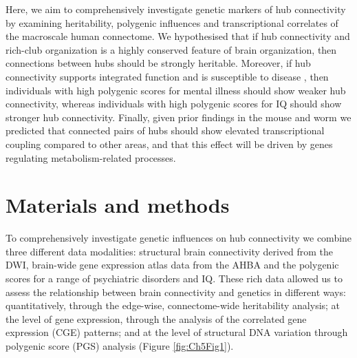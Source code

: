 Here, we aim to comprehensively investigate genetic markers of hub connectivity by examining heritability, polygenic influences and transcriptional correlates of the macroscale human connectome. We hypothesised that if hub connectivity and rich-club organization is a highly conserved feature of brain organization, then connections between hubs should be strongly heritable. Moreover, if hub connectivity supports integrated function and is susceptible to disease \citep{Crossley2016a,Fornito2015}, then individuals with high polygenic scores for mental illness should show weaker hub connectivity, whereas individuals with high polygenic scores for IQ should show stronger hub connectivity. Finally, given prior findings in the mouse \citep{Fulcher2016} and worm \citep{Arnatkeviciute2018} we predicted that connected pairs of hubs should show elevated transcriptional coupling compared to other areas, and that this effect will be driven by genes regulating metabolism-related processes. 

\section{Materials and methods}

To comprehensively investigate genetic influences on hub connectivity we combine three different data modalities: structural brain connectivity derived from the DWI, brain-wide gene expression atlas data from the AHBA and the polygenic scores for a range of psychiatric disorders and IQ. These rich data allowed us to assess the relationship between brain connectivity and genetics in different ways: quantitatively, through the edge-wise, connectome-wide heritability analysis; at the level of gene expression, through the analysis of the correlated gene expression (CGE) patterns; and at the level of structural DNA variation through polygenic score (PGS) analysis (Figure \ref{fig:Ch5Fig1}). 

